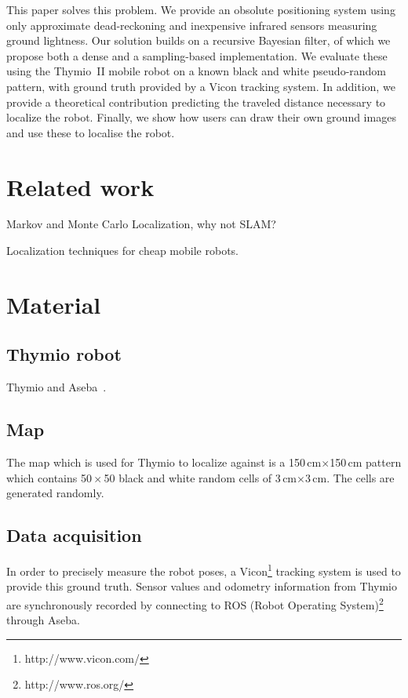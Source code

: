 \documentclass[letterpaper, 10pt, conference]{ieeeconf}
\begin{document}
This paper solves this problem.
We provide an obsolute positioning system using only approximate dead-reckoning and inexpensive infrared sensors measuring ground lightness.
Our solution builds on a recursive Bayesian filter, of which we propose both a dense and a sampling-based implementation.
We evaluate these using the Thymio~II mobile robot on a known black and white pseudo-random pattern, with ground truth provided by a Vicon tracking system.
In addition, we provide a theoretical contribution predicting the traveled distance necessary to localize the robot.
Finally, we show how users can draw their own ground images and use these to localise the robot.

\section{Related work}

Markov and Monte Carlo Localization, why not SLAM?

Localization techniques for cheap mobile robots.

\section{Material}
\subsection{Thymio robot}

Thymio and Aseba~\cite{magnenat2012arso, aseba2011tmech, riedo2013arso}.

\subsection{Map}
The map which is used for Thymio to localize against is a 150\,cm$\times$150\,cm pattern which contains 50\,$\times$\,50 black and white random cells of 3\,cm$\times$3\,cm. 
The cells are generated randomly.
\subsection{Data acquisition}
In order to precisely measure the robot poses, a Vicon\footnote{http://www.vicon.com/} tracking system is used to provide this ground truth.
Sensor values and odometry information from Thymio are synchronously recorded by connecting to ROS (Robot Operating System)\footnote{http://www.ros.org/} through Aseba.
\end{document}
